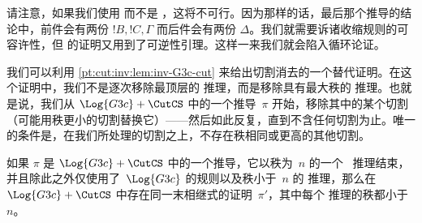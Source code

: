 \documentclass[../../../include/open-logic-section]{subfiles}
\begin{document}
请注意，如果我们使用 \Cut{} 而不是 \CutCS，这将不可行。因为那样的话，最后那个推导的结论中，前件会有两份 $!B, !C, \Gamma$ 而后件会有两份 $\Delta$。我们就需要诉诸收缩规则的可容许性，但  的证明又用到了可逆性引理。这样一来我们就会陷入循环论证。

我们可以利用 \cref{pt:cut:inv:lem:inv-G3c-cut} 来给出切割消去的一个替代证明。在这个证明中，我们不是逐次移除最顶层的 \CutCS{} 推理，而是移除具有最大秩的 \CutCS{} 推理。也就是说，我们从 $\Log{G3c} + \CutCS$ 中的一个推导~$\pi$ 开始，移除其中的某个切割（可能用秩更小的切割替换它）——然后如此反复，直到不含任何切割为止。唯一的条件是，在我们所处理的切割之上，不存在秩相同或更高的其他切割。

\begin{lem} 如果 $\pi$ 是 $\Log{G3c}+\CutCS$ 中的一个推导，它以秩为~$n$ 的一个~\CutCS{} 推理结束，并且除此之外仅使用了~$\Log{G3c}$ 的规则以及秩小于~$n$ 的 \CutCS{} 推理，那么在~$\Log{G3c} + \CutCS$ 中存在同一末相继式的证明~$\pi'$，其中每个 \CutCS{} 推理的秩都小于~$n$。
\end{lem}
\end{document}
